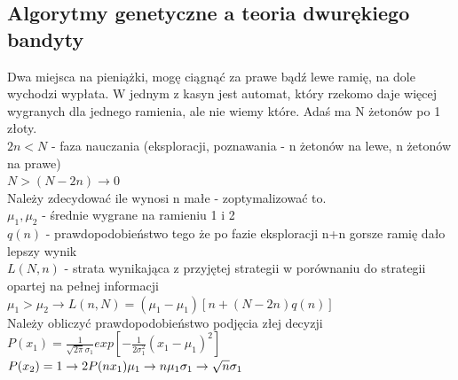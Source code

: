 \documentclass{article}
\begin{document}
			\subsection{Algorytmy genetyczne a teoria dwurękiego bandyty}
			Dwa miejsca na pieniążki, mogę ciągnąć za prawe bądź lewe ramię, na dole wychodzi wypłata. W jednym z kasyn jest automat, który rzekomo daje więcej wygranych dla jednego ramienia, ale nie wiemy które. Adaś ma N żetonów po 1 złoty. \\
			$2n<N$ - faza nauczania (eksploracji, poznawania - n żetonów na lewe, n żetonów na prawe)\\
			$N>(N-2n)\rightarrow0$\\
			Należy zdecydować ile wynosi n małe - zoptymalizować to.\\
			$\mu _1, \mu _2$ - średnie wygrane na ramieniu 1 i 2\\
			$q(n)$ - prawdopodobieństwo tego że po fazie eksploracji n+n gorsze ramię dało lepszy wynik\\
			$L(N,n)$ - strata wynikająca z przyjętej strategii w porównaniu do strategii opartej na pełnej informacji \\
			$\mu _1 > \mu _2 \rightarrow L(n,N)=(\mu _1 - \mu _1)[n+(N - 2n)q(n)]$ \\
			Należy obliczyć prawdopodobieństwo podjęcia złej decyzji \\
			$P(x_1)=\frac{1}{\sqrt{2\pi}\sigma _1}exp[-\frac{1}{2\sigma^2_1}(x_1 - \mu _1)^2]$ \\
			$P(x_2)=1\rightarrow2\\
			P(nx_1) \mu_1 \rightarrow n\mu_1\\ \sigma_1 \rightarrow \sqrt{n}\sigma_1$
\end{document}
